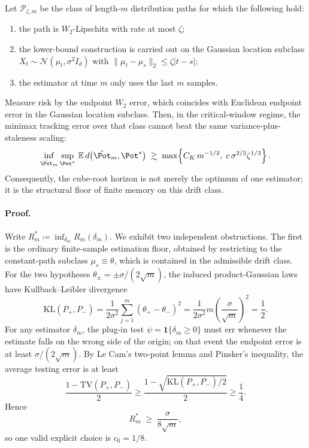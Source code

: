 \begin{proposition}\label{prop:window_minimax}
Let $\mathcal P_{\zeta,m}$ be the class of length-$m$ distribution paths for
which the following hold:
\begin{enumerate}
  \item the path is $W_2$-Lipschitz with rate at most $\zeta$;
  \item the lower-bound construction is carried out on the Gaussian location
  subclass $X_t \sim \mathcal N(\mu_t,\sigma^2 I_d)$ with
  $\|\mu_t-\mu_s\|_2 \le \zeta |t-s|$;
  \item the estimator at time $m$ only uses the last $m$ samples.
\end{enumerate}
Measure risk by the endpoint $W_2$ error, which coincides with Euclidean
endpoint error in the Gaussian location subclass. Then, in the critical-window
regime, the minimax tracking error over that class cannot beat the same
variance-plus-staleness scaling:
\[
  \inf_{\hat\Pot_m}\sup_{\Pot^*}\,\mathbb{E}\,d\bigl(\hat\Pot_m,\Pot^*\bigr)
  \;\gtrsim\; \max\!\left\{C_K\,m^{-1/2},\; c\,\sigma^{2/3}\zeta^{1/3}\right\}.
\]
Consequently, the cube-root horizon is not merely the optimum of one estimator;
it is the structural floor of finite memory on this drift class.
\end{proposition}

\paragraph{Proof.}
Write $R_m^* \coloneqq \inf_{\delta_m} R_m(\delta_m)$. We exhibit two
independent obstructions. The first is the ordinary finite-sample estimation
floor, obtained by restricting to the constant-path subclass $\mu_s \equiv
\theta$, which is contained in the admissible drift class. For the two
hypotheses $\theta_\pm = \pm \sigma /(2\sqrt{m})$, the induced product-Gaussian
laws have Kullback--Leibler divergence
\[
  \mathrm{KL}(P_+,P_-)
  = \frac{1}{2\sigma^2} \sum_{j=1}^{m} (\theta_+ - \theta_-)^2
  = \frac{1}{2\sigma^2} m\left(\frac{\sigma}{\sqrt{m}}\right)^2
  = \frac{1}{2}.
\]
For any estimator $\delta_m$, the plug-in test $\psi = \mathbf{1}\{\delta_m \geq 0\}$
must err whenever the estimate falls on the wrong side of the origin; on that
event the endpoint error is at least $\sigma /(2\sqrt{m})$. By Le Cam's
two-point lemma and Pinsker's inequality, the average testing error is at least
\[
  \frac{1-\mathrm{TV}(P_+,P_-)}{2}
  \geq
  \frac{1-\sqrt{\mathrm{KL}(P_+,P_-)/2}}{2}
  \geq \frac{1}{4}.
\]
Hence
\[
  R_m^* \;\geq\; \frac{\sigma}{8\sqrt{m}},
\]
so one valid explicit choice is $c_0 = 1/8$.

